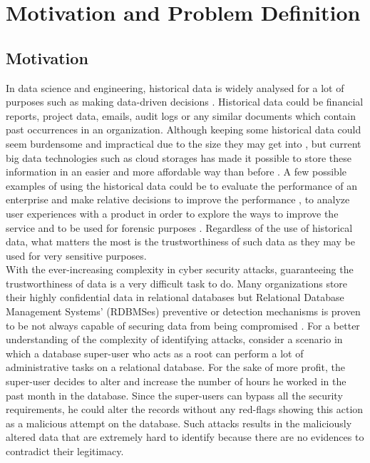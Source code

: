 \chapter{Motivation and Problem Definition} \label{ch:motivation}

	\section{Motivation} \label{sec:motivation}
		In data science and engineering, historical data is widely analysed for a lot of purposes such as making data-driven decisions \cite{rose2016datascience}. Historical data could be financial reports, project data, emails, audit logs or any similar documents which contain past occurrences in an organization. Although keeping some historical data could seem burdensome and impractical due to the size they may get into \cite{crosby2009tamper-evident}, but current big data technologies such as cloud storages has made it possible to store these information in an easier and more affordable way than before \cite{talia2015dataanalysis}. A few possible examples of using the historical data could be to evaluate the performance of an enterprise and make relative decisions to improve the performance \cite{ghasemaghaei2015impactsOB}, to analyze user experiences with a product in order to explore the ways to improve the service \cite{klein2013analysis} and to be used for forensic purposes \cite{wagner2018detect}. Regardless of the use of historical data, what matters the most is the trustworthiness of such data \cite{jain2013trustworthy} as they may be used for very sensitive purposes.\\
		With the ever-increasing complexity in cyber security attacks, guaranteeing the trustworthiness of data is a very difficult task to do. Many organizations store their highly confidential data in relational databases but Relational Database Management Systems’ (RDBMSes) preventive or detection mechanisms is proven to be not always capable of securing data from being compromised \cite{wanger2017carving}. For a better understanding of the complexity of identifying attacks, consider a scenario in which a database super-user who acts as a root can perform a lot of administrative tasks on a relational database. For the sake of more profit, the super-user decides to alter and increase the number of hours he worked in the past month in the database. Since the super-users can bypass all the security requirements, he could alter the records without any red-flags showing this action as a malicious attempt on the database. Such attacks results in the maliciously altered data that are extremely hard to identify because there are no evidences to contradict their legitimacy.\\
